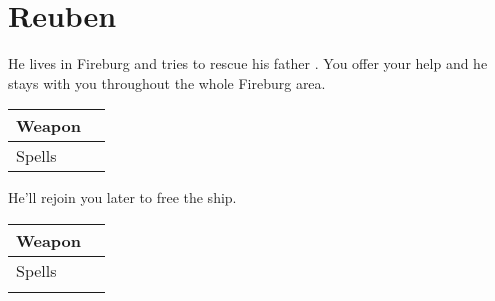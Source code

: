 \section{Reuben}
\label{char:reuben}


He lives in Fireburg and tries to rescue his father . You offer your help and he stays with you throughout the whole Fireburg area.

\bigskip
\begin{tabular}{ l | l }
	Weapon & \nameref{weapon:morning_star} \\
	\hline
	Spells & \nameref{spell:life}
\end{tabular}
\bigskip

\bigskip

He’ll rejoin you later to free the ship.

\bigskip
\begin{tabular}{ l | l }
	Weapon & \nameref{weapon:morning_star} \\
	\hline
	Spells & \nameref{spell:life} \\
	& \nameref{spell:white}
\end{tabular}
\bigskip
